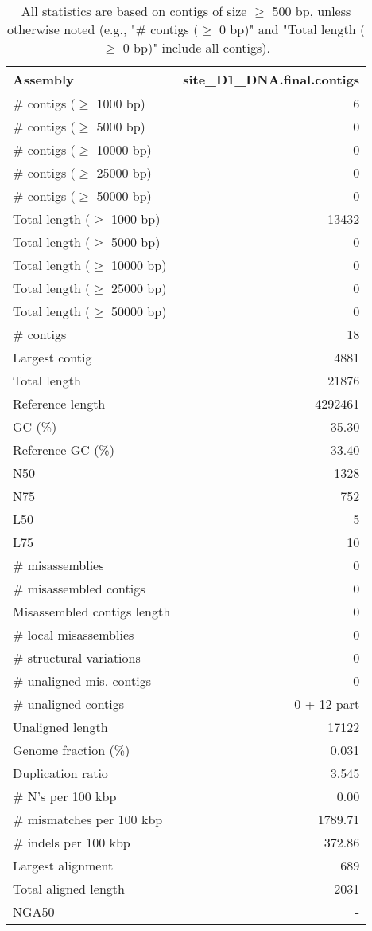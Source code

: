 \documentclass[12pt,a4paper]{article}
\begin{document}
\begin{table}[ht]
\begin{center}
\caption{All statistics are based on contigs of size $\geq$ 500 bp, unless otherwise noted (e.g., "\# contigs ($\geq$ 0 bp)" and "Total length ($\geq$ 0 bp)" include all contigs).}
\begin{tabular}{|l*{1}{|r}|}
\hline
Assembly & site\_D1\_DNA.final.contigs \\ \hline
\# contigs ($\geq$ 1000 bp) & 6 \\ \hline
\# contigs ($\geq$ 5000 bp) & 0 \\ \hline
\# contigs ($\geq$ 10000 bp) & 0 \\ \hline
\# contigs ($\geq$ 25000 bp) & 0 \\ \hline
\# contigs ($\geq$ 50000 bp) & 0 \\ \hline
Total length ($\geq$ 1000 bp) & 13432 \\ \hline
Total length ($\geq$ 5000 bp) & 0 \\ \hline
Total length ($\geq$ 10000 bp) & 0 \\ \hline
Total length ($\geq$ 25000 bp) & 0 \\ \hline
Total length ($\geq$ 50000 bp) & 0 \\ \hline
\# contigs & 18 \\ \hline
Largest contig & 4881 \\ \hline
Total length & 21876 \\ \hline
Reference length & 4292461 \\ \hline
GC (\%) & 35.30 \\ \hline
Reference GC (\%) & 33.40 \\ \hline
N50 & 1328 \\ \hline
N75 & 752 \\ \hline
L50 & 5 \\ \hline
L75 & 10 \\ \hline
\# misassemblies & 0 \\ \hline
\# misassembled contigs & 0 \\ \hline
Misassembled contigs length & 0 \\ \hline
\# local misassemblies & 0 \\ \hline
\# structural variations & 0 \\ \hline
\# unaligned mis. contigs & 0 \\ \hline
\# unaligned contigs & 0 + 12 part \\ \hline
Unaligned length & 17122 \\ \hline
Genome fraction (\%) & 0.031 \\ \hline
Duplication ratio & 3.545 \\ \hline
\# N's per 100 kbp & 0.00 \\ \hline
\# mismatches per 100 kbp & 1789.71 \\ \hline
\# indels per 100 kbp & 372.86 \\ \hline
Largest alignment & 689 \\ \hline
Total aligned length & 2031 \\ \hline
NGA50 & - \\ \hline
\end{tabular}
\end{center}
\end{table}
\end{document}
